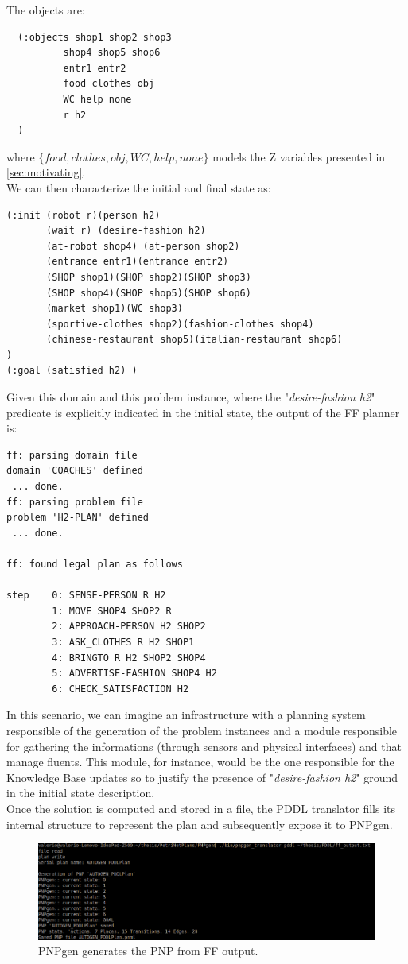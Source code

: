 \documentclass[pdftex,12pt,a4paper]{report}
\begin{document}
\noindent The objects are:
\begin{verbatim}
  (:objects shop1 shop2 shop3
          shop4 shop5 shop6
          entr1 entr2
          food clothes obj
          WC help none
          r h2
  )
\end{verbatim}
\noindent where $\{food, clothes, obj, WC, help, none\}$ models the Z variables presented in \ref{sec:motivating}.\\
\noindent We can then characterize the initial and final state as:
\begin{verbatim}
(:init (robot r)(person h2)
       (wait r) (desire-fashion h2)
	   (at-robot shop4) (at-person shop2)
       (entrance entr1)(entrance entr2)
       (SHOP shop1)(SHOP shop2)(SHOP shop3)
       (SHOP shop4)(SHOP shop5)(SHOP shop6)
       (market shop1)(WC shop3)
       (sportive-clothes shop2)(fashion-clothes shop4)
       (chinese-restaurant shop5)(italian-restaurant shop6)
)
(:goal (satisfied h2) )
\end{verbatim}
\noindent Given this domain and this problem instance, where the "\textit{desire-fashion h2}" predicate is explicitly indicated in the initial state, the output of the FF planner is:
\begin{verbatim}
ff: parsing domain file
domain 'COACHES' defined
 ... done.
ff: parsing problem file
problem 'H2-PLAN' defined
 ... done.    

ff: found legal plan as follows

step    0: SENSE-PERSON R H2
        1: MOVE SHOP4 SHOP2 R
        2: APPROACH-PERSON H2 SHOP2
        3: ASK_CLOTHES R H2 SHOP1
        4: BRINGTO R H2 SHOP2 SHOP4
        5: ADVERTISE-FASHION SHOP4 H2
        6: CHECK_SATISFACTION H2
\end{verbatim}
\noindent In this scenario, we can imagine an infrastructure with a planning system responsible of the generation of the problem instances and a module responsible for gathering the informations (through sensors and physical interfaces) and that manage fluents. This module, for instance, would be the one responsible for the Knowledge Base updates so to justify the presence of  "\textit{desire-fashion h2}" ground in the initial state description.\\

\noindent Once the solution is computed and stored in a file, the PDDL translator fills its internal structure to represent the plan and subsequently expose it to PNPgen. 

\begin{figure}[H]
	\centering
	\includegraphics[scale=0.4]{images/pddl_coaches.png}
	\caption{PNPgen generates the PNP from FF output.}
\end{figure}
\end{document}
